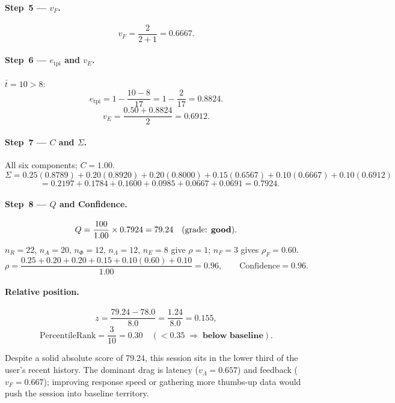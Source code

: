 \documentclass[11pt,a4paper]{article}
\begin{document}
\paragraph{Step~5 --- $v_F$.}
\[
  v_F = \frac{2}{2+1} = 0.6667.
\]

\paragraph{Step~6 --- $e_{\mathrm{tpi}}$ and $v_E$.}
$\bar{t}=10>8$:
\[
  e_{\mathrm{tpi}} = 1-\frac{10-8}{17} = 1-\frac{2}{17} = 0.8824.
\]
\[
  v_E = \frac{0.50+0.8824}{2} = 0.6912.
\]

\paragraph{Step~7 --- $C$ and $\Sigma$.}
All six components; $C=1.00$.
\[
  \Sigma = 0.25(0.8789)+0.20(0.8920)+0.20(0.8000)
         +0.15(0.6567)+0.10(0.6667)+0.10(0.6912)
\]
\[
  \phantom{\Sigma}= 0.2197+0.1784+0.1600+0.0985+0.0667+0.0691 = 0.7924.
\]

\paragraph{Step~8 --- $Q$ and Confidence.}
\[
  Q = \frac{100}{1.00}\times0.7924 = 79.24 \quad (\text{grade: \textbf{good}}).
\]
$n_R=22$, $n_A=20$, $n_\Phi=12$, $n_\Lambda=12$, $n_E=8$ give $\rho=1$;
$n_F=3$ gives $\rho_F=0.60$.
\[
  \rho = \frac{0.25+0.20+0.20+0.15+0.10(0.60)+0.10}{1.00} = 0.96,
  \qquad \text{Confidence} = 0.96.
\]

\paragraph{Relative position.}
\[
  z = \frac{79.24-78.0}{8.0} = \frac{1.24}{8.0} = 0.155,
\]
\[
  \text{PercentileRank} = \frac{3}{10} = 0.30 \quad (<0.35\;\Rightarrow\;\textbf{below baseline}).
\]

Despite a solid absolute score of 79.24, this session sits in the lower
third of the user's recent history.  The dominant drag is latency
($v_\Lambda=0.657$) and feedback ($v_F=0.667$); improving response speed
or gathering more thumbs-up data would push the session into baseline
territory.
\end{document}
